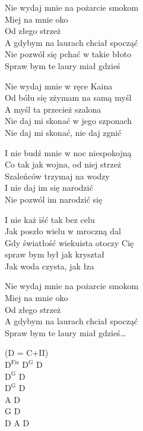 \begin{text}
    \hfill\break
    Nie wydaj mnie na pożarcie smokom\\
    Miej na mnie oko\\
    Od złego strzeż\\
    A gdybym na laurach chciał spocząć\\
    Nie pozwól się pchać w takie błoto\\
    Spraw bym te laury miał gdzieś

    Nie wydaj mnie w ręce Kaina\\
    Od bólu się zżymam na samą myśl\\
    A myśl ta przecież szalona\\
    Nie daj mi skonać w jego szponach\\
    Nie daj mi skonać, nie daj zgnić

    I nie budź mnie w noc niespokojną\\
    Co tak jak wojna, od niej strzeż\\
    Szaleńców trzymaj na wodzy\\
    I nie daj im się narodzić\\
    Nie pozwól im narodzić się

    I nie każ iść tak bez celu\\
    Jak poszło wielu w mroczną dal\\
    Gdy światłość wiekuista otoczy Cię\\
    spraw bym był jak kryształ\\
    Jak woda czysta, jak łza

    Nie wydaj mnie na pożarcie smokom\\
    Miej na mnie oko\\
    Od złego strzeż\\
    A gdybym na laurach chciał spocząć\\
    Spraw bym te laury miał gdzieś…
\end{text}
\begin{chord}
    (D = C+II)\\
    $\mathrm{D^{Fis}}$ $\mathrm{D^G}$ D\\
    $\mathrm{D^G}$ D\\
    $\mathrm{D^G}$ D\\
    A D\\
    G D\\
    D A D
\end{chord}
